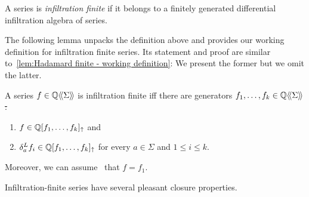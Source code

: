 \begin{definition}
    A series is \emph{infiltration finite} if it belongs to a
    finitely generated differential infiltration algebra of series.
\end{definition}
%
The following lemma unpacks the definition above
and provides our working definition for infiltration finite series.
%
Its statement and proof are similar to~\cref{lem:Hadamard finite - working definition}:
We present the former but we omit the latter.
%
\begin{lemma}
    \label{lem:infiltration finite - working definition}
    A series $f \in \mathbb Q\langle\!\langle\Sigma\rangle\!\rangle$ is infiltration finite
    iff there are generators $f_1, \dots, f_k \in \mathbb Q\langle\!\langle\Sigma\rangle\!\rangle$ \st:
    \begin{enumerate}
        \item $f \in \mathbb Q[f_1, \dots, f_k]_{\operatorname{\uparrow}}$ and
        \item $\delta^L_{a} f_i \in \mathbb Q[f_1, \dots, f_k]_{\operatorname{\uparrow}}$
        for every $a \in \Sigma$ and $1 \leq i \leq k$.
    \end{enumerate}
    Moreover, we can assume \wlg~that $f = f_1$.
\end{lemma}

Infiltration-finite series have several pleasant closure properties.


